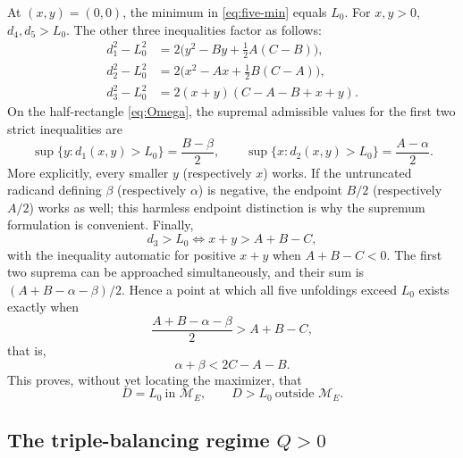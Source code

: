 \documentclass[11pt]{article}
\theoremstyle{definition}
\begin{document}
At $(x,y)=(0,0)$, the minimum in \eqref{eq:five-min} equals $L_0$.
For $x,y>0$, $d_4,d_5>L_0$.  The other three inequalities factor as follows:
\begin{align}
 d_1^2-L_0^2&=2\bigl(y^2-By+\tfrac12A(C-B)\bigr),\label{eq:d1gap}\\
 d_2^2-L_0^2&=2\bigl(x^2-Ax+\tfrac12B(C-A)\bigr),\label{eq:d2gap}\\
 d_3^2-L_0^2&=2(x+y)(C-A-B+x+y).\label{eq:d3gap}
\end{align}
On the half-rectangle \eqref{eq:Omega}, the supremal admissible values
for the first two strict inequalities are
\[
  \sup\{y:d_1(x,y)>L_0\}=\frac{B-\beta}{2},\qquad
  \sup\{x:d_2(x,y)>L_0\}=\frac{A-\alpha}{2}.
\]
More explicitly, every smaller $y$ (respectively $x$) works.  If the
untruncated radicand defining $\beta$ (respectively $\alpha$) is negative,
the endpoint $B/2$ (respectively $A/2$) works as well; this harmless endpoint
distinction is why the supremum formulation is convenient.  Finally,
\[
 d_3>L_0\iff x+y>A+B-C,
\]
with the inequality automatic for positive $x+y$ when $A+B-C<0$.
The first two suprema can be approached simultaneously, and their sum is
$(A+B-\alpha-\beta)/2$.  Hence a point at which all five unfoldings exceed
$L_0$ exists exactly when
\[
  \frac{A+B-\alpha-\beta}{2}>A+B-C,
\]
that is,
\begin{equation}\label{eq:notME}
  \alpha+\beta<2C-A-B.
\end{equation}
This proves, without yet locating the maximizer, that
\begin{equation}\label{eq:Dbaseline}
  D=L_0\ \text{in }\mathcal M_E,
  \qquad D>L_0\ \text{outside }\mathcal M_E.
\end{equation}

\subsection{\texorpdfstring{The triple-balancing regime $Q>0$}{The triple-balancing regime Q > 0}}
\end{document}
